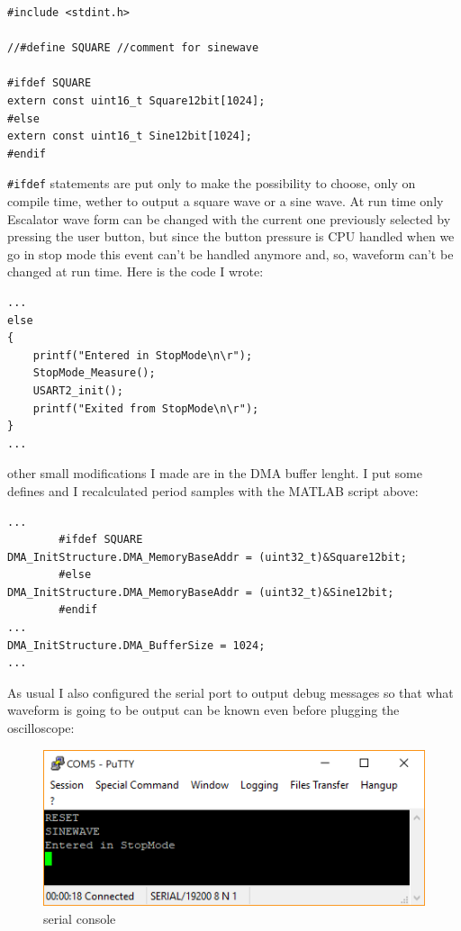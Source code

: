 \documentclass[peerreview]{IEEEtran}
\begin{document}
\begin{lstlisting}[style=CStyle]
#include <stdint.h>

//#define SQUARE //comment for sinewave

#ifdef SQUARE
extern const uint16_t Square12bit[1024];
#else
extern const uint16_t Sine12bit[1024];
#endif
\end{lstlisting}
\lstinline[style=CStyle]{#ifdef} statements are put only to make the possibility to choose, only on compile time, wether to output a square wave or a sine wave. At run time only Escalator wave form can be changed with the current one previously selected by pressing the user button, but since the button pressure is CPU handled when we go in stop mode this event can't be handled anymore and, so, waveform can't be changed at run time. Here is the code I wrote:
\begin{lstlisting}[style=CStyle]
...
else
{
	printf("Entered in StopMode\n\r");
	StopMode_Measure();
	USART2_init();
	printf("Exited from StopMode\n\r");
}
...
\end{lstlisting}
other small modifications I made are in the DMA buffer lenght. I put some defines and I recalculated period samples with the MATLAB script above:
\begin{lstlisting}[style=CStyle]
...
		#ifdef SQUARE
DMA_InitStructure.DMA_MemoryBaseAddr = (uint32_t)&Square12bit;
		#else
DMA_InitStructure.DMA_MemoryBaseAddr = (uint32_t)&Sine12bit;
		#endif
...
DMA_InitStructure.DMA_BufferSize = 1024;
...
\end{lstlisting}
As usual I also configured the serial port to output debug messages so that what waveform is going to be output can be known even before plugging the oscilloscope:
\begin{figure}[!ht]
\centering
\includegraphics[width=0.8\columnwidth]{serial} 
\caption{serial console}
\label{fig_ser}
\end{figure}
\end{document}
